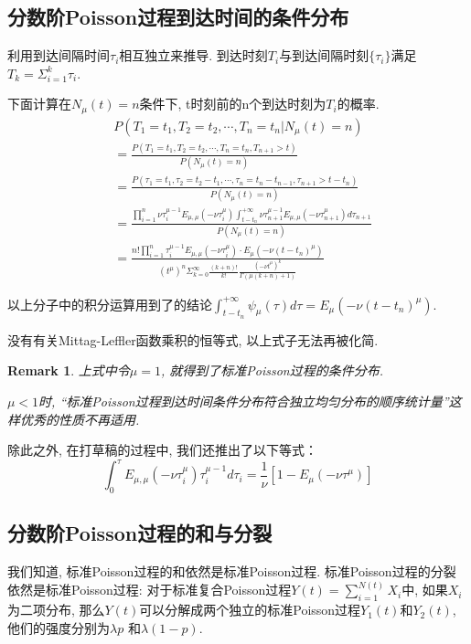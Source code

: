 \documentclass[a4paper, 12pt]{ctexart}
\newtheorem*{remark}{Remark}
\begin{document}
\subsection{分数阶Poisson过程到达时间的条件分布}
利用到达间隔时间$\tau _i$相互独立来推导. 到达时刻$T_i$与到达间隔时刻$\{\tau _i\}$满足$T_k =\Sigma _{i=1}^{k} \tau _i$.

下面计算在$N_{\mu}(t)=n$条件下, t时刻前的n个到达时刻为$T_i$的概率. 
\begin{equation}
\begin{split}
&P(T_1=t_1,  T_2=t_2,  \cdots,  T_n=t_n|N_\mu (t)=n)\\
&=\frac{P(T_1=t_1,  T_2=t_2,  \cdots,  T_n=t_n,  T_{n+1}>t)}{P(N_\mu (t)=n)}\\
&=\frac{P(\tau _1=t_1,  \tau _2=t_2-t_1,  \cdots,  \tau _n=t_n - t_{n-1},  \tau _{n+1}>t-t_n)}{P(N_\mu (t)=n)}\\
&= \frac{\prod _{i=1}^{n}\nu \tau _i^{\mu -1}E_{\mu ,  \mu}(-\nu \tau _i ^{\mu})\int _{t-t_n}^{+\infty}\nu \tau _{n+1}^{\mu -1}E_{\mu ,  \mu}(-\nu \tau _{n+1}^{\mu})d\tau _{n+1}}{P(N_\mu (t)=n)}\\
&= \frac{n!\prod _{i=1}^{n} \tau _i^{\mu -1}E_{\mu ,  \mu}(-\nu \tau _i ^{\mu}) \cdot E_{\mu}\left(-\nu (t-t_n)^{\mu}\right)}{(t^{\mu})^n \Sigma _{k=0}^{\infty}\frac{(k+n)!}{k!}\frac{(-\nu t^{\mu})^k}{\Gamma \left(\mu (k+n)+1\right)}}\label{eq:conddist}
\end{split}
\end{equation}


以上分子中的积分运算用到了\cite{1}的结论$\int _{t-t_n}^{+\infty} \psi _{\mu} (\tau)d\tau = E_{\mu}\left(-\nu (t-t_n)^{\mu}\right)$. 

没有有关Mittag-Leffler函数乘积的恒等式,   以上式子无法再被化简. 

\begin{remark}
上式中令$\mu = 1$,   就得到了标准Poisson过程的条件分布. 

$\mu<1$时, ``标准Poisson过程到达时间条件分布符合独立均匀分布的顺序统计量''这样优秀的性质不再适用. 
\end{remark}

除此之外, 在打草稿的过程中,   我们还推出了以下等式：
\begin{equation}
\int _0^{\tau} E_{\mu ,  \mu}(-\nu \tau _i^{\mu})\tau _i^{\mu -1}d\tau _i =\frac{1}{\nu}[1-E_{\mu}(-\nu \tau ^{\mu})]
\end{equation}
 
\subsection{分数阶Poisson过程的和与分裂}
我们知道,   标准Poisson过程的和依然是标准Poisson过程. 标准Poisson过程的分裂依然是标准Poisson过程: 对于标准复合Poisson过程$Y(t)=\sum_{i=1}^{N(t)}X_i$中,   如果$X_i$为二项分布,   那么$Y(t)$可以分解成两个独立的标准Poisson过程$Y_1(t)$和$Y_2(t)$,   他们的强度分别为$\lambda p$ 和$\lambda (1-p)$. 
\end{document}
